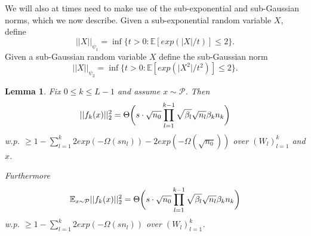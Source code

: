 \documentclass{article}
\theoremstyle{plain}
\newtheorem{lemma}[Theorem]{Lemma}
\theoremstyle{definition}
\theoremstyle{remark}
\begin{document}
We will also at times need to make use of the sub-exponential and sub-Gaussian norms, which we now describe.
Given a sub-exponential random variable $X$, define 
\begin{equation*}
    \vert\vert X\vert\vert_{\psi_1} = \inf\{t > 0: 
    \mathbb{E}[exp(\vert X\vert/t)] \leq 2\}.
\end{equation*}
Given a sub-Gaussian random variable $X$ define the sub-Gaussian norm
\begin{equation*}
    \vert\vert X\vert\vert_{\psi_2} = \inf\{t > 0: 
    \mathbb{E}[exp(\vert X^2\vert/t^2)] \leq 2\}.
\end{equation*}



\begin{lemma}\label{lemmac1_cos}
Fix $0 \leq k \leq L-1$ and 
assume $x \sim \mathcal{P}$. Then
\begin{equation*}
	\vert\vert f_k(x)\vert\vert_2^2 = \Theta\bigg{(}s\cdot \sqrt{n_0}
	\prod_{l=1}^{k-1}\sqrt{\beta_l}\sqrt{n_l}\beta_k n_k\bigg{)}
\end{equation*}
w.p. $\geq 1 - \sum_{l=1}^k2exp(-\Omega(sn_l)) - 2exp(-\Omega(\sqrt{n_0}))$ over
$(W_l)_{l=1}^k$ and $x$.

Furthermore 
\begin{equation*}
	\mathbb{E}_{x\sim \mathcal{P}}\vert\vert f_k(x)\vert\vert^2_2 = 
	\Theta\bigg{(}s\cdot \sqrt{n_0}
	\prod_{l=1}^{k-1}\sqrt{\beta_l}\sqrt{n_l}\beta_k n_k\bigg{)}
\end{equation*} 
w.p. $\geq 1 - \sum_{l=1}^k2exp(-\Omega(sn_l))$ over
$(W_l)_{l=1}^k$.
\end{lemma}
\end{document}
